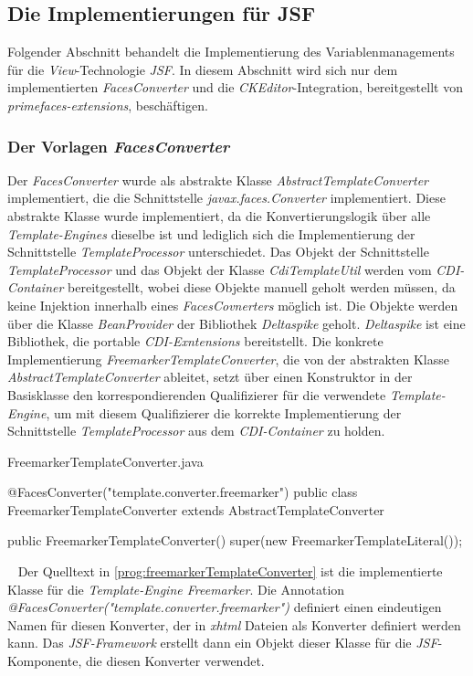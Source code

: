 \subsection{Die Implementierungen für JSF}
Folgender Abschnitt behandelt die Implementierung des Variablenmanagements für die \emph{View}-Technologie \emph{JSF}. In diesem Abschnitt wird sich nur dem implementierten \emph{FacesConverter} und die \emph{CKEditor}-Integration, bereitgestellt von \emph{primefaces-extensions}, beschäftigen.

\subsubsection{Der Vorlagen \emph{FacesConverter}}
Der \emph{FacesConverter} wurde als abstrakte Klasse \emph{AbstractTemplateConverter} implementiert, die die Schnittstelle \emph{javax.faces.Converter} implementiert. Diese abstrakte Klasse wurde implementiert, da die Konvertierungslogik über alle \emph{Template-Engines} dieselbe ist und lediglich sich die Implementierung der Schnittstelle \emph{TemplateProcessor} unterschiedet. Das Objekt der Schnittstelle \emph{TemplateProcessor} und das Objekt der Klasse \emph{CdiTemplateUtil} werden vom \emph{CDI-Container} bereitgestellt, wobei diese Objekte manuell geholt werden müssen, da keine Injektion innerhalb eines \emph{FacesCovnerters} möglich ist. Die Objekte werden über die Klasse \emph{BeanProvider} der Bibliothek \emph{Deltaspike} geholt. \emph{Deltaspike} ist eine Bibliothek, die portable \emph{CDI-Exntensions} bereitstellt. Die konkrete Implementierung \emph{FreemarkerTemplateConverter}, die von der abstrakten Klasse \emph{AbstractTemplateConverter} ableitet, setzt über einen Konstruktor in der Basisklasse den korrespondierenden Qualifizierer für die verwendete \emph{Template-Engine}, um mit diesem Qualifizierer die korrekte Implementierung der Schnittstelle \emph{TemplateProcessor} aus dem \emph{CDI-Container} zu holden.
\newpage
\begin{program}
\caption{FreemarkerTemplateConverter.java}
\label{prog:freemarkerTemplateConverter}
\begin{JavaCode}
@FacesConverter("template.converter.freemarker")
public class FreemarkerTemplateConverter extends AbstractTemplateConverter {

    public FreemarkerTemplateConverter() {
        super(new FreemarkerTemplateLiteral());
    }
}
\end{JavaCode}
\end{program}
\ \newline
Der Quelltext in \ref{prog:freemarkerTemplateConverter} ist die implementierte Klasse für die \emph{Template-Engine Freemarker}. Die Annotation \emph{@FacesConverter("template.converter.freemarker")} definiert einen eindeutigen Namen für diesen Konverter, der in \emph{xhtml} Dateien als Konverter definiert werden kann. Das \emph{JSF-Framework} erstellt dann ein Objekt dieser Klasse für die \emph{JSF}-Komponente, die diesen Konverter verwendet. 

